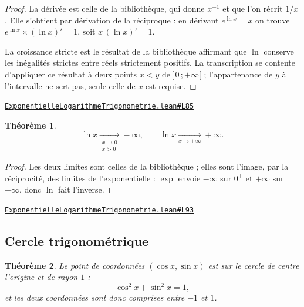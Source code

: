 \documentclass[11pt,a4paper]{article}
\theoremstyle{definition}
\theoremstyle{plain}
\newtheorem{theoreme}{Théorème}
\newcommand{\source}[2]{\par\smallskip\noindent\hfill{\footnotesize\href{#1}{\texttt{#2}}}\par\smallskip}
\begin{document}
\begin{proof}
La dérivée est celle de la bibliothèque, qui donne $x^{-1}$ et que l'on récrit $1/x$. Elle
s'obtient par dérivation de la réciproque : en dérivant $e^{\ln x} = x$ on trouve
$e^{\ln x} \times (\ln x)' = 1$, soit $x\,(\ln x)' = 1$.

La croissance stricte est le résultat de la bibliothèque affirmant que $\ln$ conserve les
inégalités strictes entre réels strictement positifs. La transcription se contente
d'appliquer ce résultat à deux points $x < y$ de $]0\,;+\infty[$ ; l'appartenance de $y$ à
l'intervalle ne sert pas, seule celle de $x$ est requise.
\end{proof}
\source{https://github.com/Commutator-IO/learn-lean/blob/main/cours/02-lycee/05-exponentielle-logarithme-trigonometrie/ExponentielleLogarithmeTrigonometrie.lean\#L85}{ExponentielleLogarithmeTrigonometrie.lean\#L85}

\begin{theoreme}
\[ \ln x \xrightarrow[\substack{x \to 0 \\ x > 0}]{} -\infty , \qquad
   \ln x \xrightarrow[x \to +\infty]{} +\infty . \]
\end{theoreme}

\begin{proof}
Les deux limites sont celles de la bibliothèque ; elles sont l'image, par la réciprocité,
des limites de l'exponentielle : $\exp$ envoie $-\infty$ sur $0^{+}$ et $+\infty$ sur
$+\infty$, donc $\ln$ fait l'inverse.
\end{proof}
\source{https://github.com/Commutator-IO/learn-lean/blob/main/cours/02-lycee/05-exponentielle-logarithme-trigonometrie/ExponentielleLogarithmeTrigonometrie.lean\#L93}{ExponentielleLogarithmeTrigonometrie.lean\#L93}

\subsection{Cercle trigonométrique}

\begin{theoreme}
Le point de coordonnées $(\cos x, \sin x)$ est sur le cercle de centre l'origine et de
rayon $1$ :
\[ \cos^{2} x + \sin^{2} x = 1 , \]
et les deux coordonnées sont donc comprises entre $-1$ et $1$.
\end{theoreme}
\end{document}

